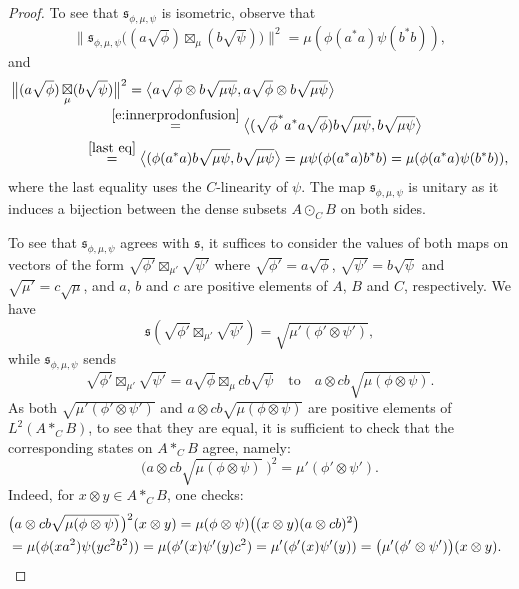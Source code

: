 \documentclass[10pt,a4paper,oneside]{amsart}
\theoremstyle{remark}
\theoremstyle{definition}
\newcommand{\cofu}[1]{\mathop{\boxtimes}_{#1}}
\newcommand{\Ltwomap}{\mathfrak{s}}
\begin{document}
\begin{proof}
To see that $ \Ltwomap_{\phi,\mu,\psi}$ is isometric, observe that
$$
\big\|\Ltwomap_{\phi,\mu,\psi}\big((a\sqrt{\phi})\cofu{\mu}(b\sqrt{\psi})\big)\big\|^2=\mu (\phi(a^*a)\psi(b^*b)),
$$
and
\begin{align*}
\big\|(a\sqrt{\phi})\cofu{\mu}(b&\sqrt{\psi})\big\|^2 =
\big\langle
a\sqrt{\phi}\otimes b\sqrt{\mu\psi},a\sqrt{\phi}\otimes b\sqrt{\mu\psi}
\big\rangle
\\[-1mm]
&\quad\,\,\,\,\stackrel{\eqref{e:innerprodonfusion}}=
\big\langle
(\sqrt{\phi}^*a^*a\sqrt{\phi}) b\sqrt{\mu\psi}, b\sqrt{\mu\psi}
\big\rangle
\\&\stackrel{\eqref{last eq}}=
\big\langle
(\phi(a^*a) b\sqrt{\mu\psi}, b\sqrt{\mu\psi}
\big\rangle
=
\mu\psi(\phi(a^*a)b^*b)=\mu (\phi(a^*a)\psi(b^*b)),
\end{align*}
where the last equality uses the $C$-linearity of $\psi$. The map $\Ltwomap_{\phi,\mu,\psi}$ is unitary as it induces a bijection between the dense subsets $A\odot_C B$ on both sides.

To see that $ \Ltwomap_{\phi,\mu,\psi}$ agrees with $\Ltwomap$, it suffices to consider the values of both maps on vectors of the form $\sqrt{\phi'} \cofu{\mu'}\sqrt{\psi'}$ where $\sqrt{\phi'}=a\sqrt{\phi}$, $\sqrt{\psi'}=b\sqrt{\psi}$ and $\sqrt{\mu'}=c\sqrt{\mu}$, and $a$, $b$ and $c$ are positive elements of $A$, $B$ and $C$, respectively. We have
$$
\Ltwomap(\sqrt{\phi'} \cofu{\mu'}\sqrt{\psi'})=\sqrt{\mu'(\phi' \otimes \psi')},
$$
while $ \Ltwomap_{\phi,\mu,\psi}$ sends 
$$
\sqrt{\phi'} \cofu{\mu'}\sqrt{\psi'}=a\sqrt{\phi} \cofu{\mu}cb\sqrt{\psi}\quad\text{to}\quad  a\otimes cb \sqrt{\mu(\phi \otimes \psi)}.
$$
As both $\sqrt{\mu'(\phi' \otimes \psi')}$ and $a\otimes cb \sqrt{\mu(\phi \otimes \psi)}$ are positive elements of $L^2(A \ast_{C}B)$, to see that they are equal, it is sufficient to check that the corresponding states on $A \ast_{C}B$ agree, namely:
\[
\big(a\otimes cb \sqrt{\mu(\phi \otimes \psi)}\;\!\big)^2=\mu'(\phi' \otimes \psi').
\]
Indeed, for $x\otimes y \in A \ast_{C}B$, one checks:
    \begin{align*}
    \!\!&\!\!\big(a\otimes cb \sqrt{\mu(\phi \otimes \psi)}\;\!\big)^2(x\otimes y)=
        \mu(\phi \otimes \psi)\big( (x\otimes y)(a\otimes cb)^2\big) \\
    \!\!&\!\!=\mu(\phi(x a^2)\psi(y c^2b^2))
        =\mu(\phi'(x)\psi'(y)c^2)
         =\mu'(\phi'(x)\psi'(y))=
         \big(\mu'(\phi' \otimes \psi')\big)(x\otimes y).\qedhere
    \end{align*}
\end{proof}
\end{document}
